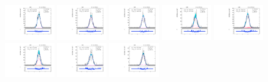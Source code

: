 \begin{figure}[htb]
\includegraphics[width=0.19\textwidth]{plots/Appendix_Recoil_Fits/ZmmData_PF_5TeV_2G_bkg/pfu1fit_24.pdf}
\includegraphics[width=0.19\textwidth]{plots/Appendix_Recoil_Fits/ZmmData_PF_5TeV_2G_bkg/pfu1fit_25.pdf}
\includegraphics[width=0.19\textwidth]{plots/Appendix_Recoil_Fits/ZmmData_PF_5TeV_2G_bkg/pfu1fit_26.pdf}
\includegraphics[width=0.19\textwidth]{plots/Appendix_Recoil_Fits/ZmmData_PF_5TeV_2G_bkg/pfu1fit_27.pdf}
\includegraphics[width=0.19\textwidth]{plots/Appendix_Recoil_Fits/ZmmData_PF_5TeV_2G_bkg/pfu1fit_28.pdf}
\includegraphics[width=0.19\textwidth]{plots/Appendix_Recoil_Fits/ZmmData_PF_5TeV_2G_bkg/pfu1fit_29.pdf}
\includegraphics[width=0.19\textwidth]{plots/Appendix_Recoil_Fits/ZmmData_PF_5TeV_2G_bkg/pfu1fit_30.pdf}
\includegraphics[width=0.19\textwidth]{plots/Appendix_Recoil_Fits/ZmmData_PF_5TeV_2G_bkg/pfu1fit_31.pdf}

\end{figure}
